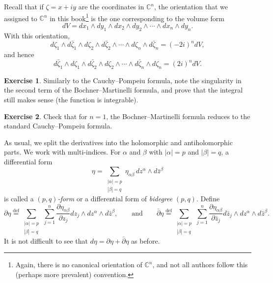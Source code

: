 \documentclass[12pt,openany]{book}
\newcommand{\abs}[1]{\left\lvert {#1} \right\rvert}
\newcommand{\C}{{\mathbb{C}}}
\newcommand{\myindex}[1]{#1\index{#1}}
\theoremstyle{plain}
\theoremstyle{remark}
\theoremstyle{definition}
\newenvironment{exbox}{%
    \def\FrameCommand{\vrule width 1pt \relax\hspace{10pt}}%
    \MakeFramed {\advance \hsize -\width \FrameRestore}%
}{%
    \endMakeFramed
}
\theoremstyle{exercise}
\newtheorem{exercise}{Exercise}[section]
\theoremstyle{example}
\begin{document}
Recall that if $\zeta = x+iy$ are the coordinates in $\C^n$, the orientation that we assigned to $\C^n$ in
this book\footnote{Again, there is
no canonical orientation of $\C^n$, and
not all authors follow this (perhaps more prevalent) convention.}
is the one corresponding to the volume form
%
\begin{equation*}
dV = dx_1 \wedge dy_1 \wedge dx_2 \wedge dy_2 \wedge \cdots \wedge dx_n \wedge dy_n .
\end{equation*}
With this orientation,
\begin{equation*}
d\zeta_1 \wedge d\bar{\zeta}_1 \wedge
d\zeta_2 \wedge d\bar{\zeta}_2 \wedge
\cdots \wedge
d\zeta_n \wedge d\bar{\zeta}_n = {(-2i)}^n dV ,
\end{equation*}
and hence
\begin{equation*}
d\bar{\zeta}_1 \wedge d\zeta_1 \wedge
d\bar{\zeta}_2 \wedge d\zeta_2 \wedge
\cdots \wedge
d\bar{\zeta}_n \wedge d\zeta_n = {(2i)}^n dV .
\end{equation*}

\begin{exbox}
\begin{exercise}
Similarly to the Cauchy--Pompeiu formula,
note the singularity in the second term of the Bochner--Martinelli formula,
and prove that the integral still makes
sense (the function is integrable).
\end{exercise}

\begin{exercise}
Check that for $n=1$, the Bochner--Martinelli formula
reduces to the standard Cauchy--Pompeiu formula.
\end{exercise}
\end{exbox}

As usual, we split the derivatives into the holomorphic and
antiholomorphic parts.  We work with multi-indices.  For $\alpha$ and $\beta$
with $\abs{\alpha}=p$ and 
$\abs{\beta}=q$, a differential form
\begin{equation*}
\eta = 
\sum_{\substack{\abs{\alpha}=p \\ \abs{\beta}=q}}
\eta_{\alpha \beta} \, dz^\alpha \wedge d\bar{z}^\beta 
\end{equation*}
is called a \emph{\myindex{$(p,q)$-form}} or a differential form of
\emph{\myindex{bidegree}} $(p,q)$.
Define
%
%
\begin{equation*}
\partial \eta \overset{\text{def}}{=}
\sum_{\substack{\abs{\alpha}=p \\ \abs{\beta}=q}}
\,
\sum_{j=1}^n
\frac{\partial \eta_{\alpha \beta}}{\partial z_j} dz_j \wedge dz^\alpha
\wedge d\bar{z}^\beta ,
\qquad \text{and} \qquad
\bar{\partial} \eta \overset{\text{def}}{=}
\sum_{\substack{\abs{\alpha}=p \\ \abs{\beta}=q}}
\,
\sum_{j=1}^n
\frac{\partial \eta_{\alpha \beta}}{\partial \bar{z}_j} d\bar{z}_j \wedge dz^\alpha
\wedge d\bar{z}^\beta .
\end{equation*}
It is not difficult to see that $d \eta = \partial \eta +
\bar{\partial} \eta$ as before.
\end{document}
